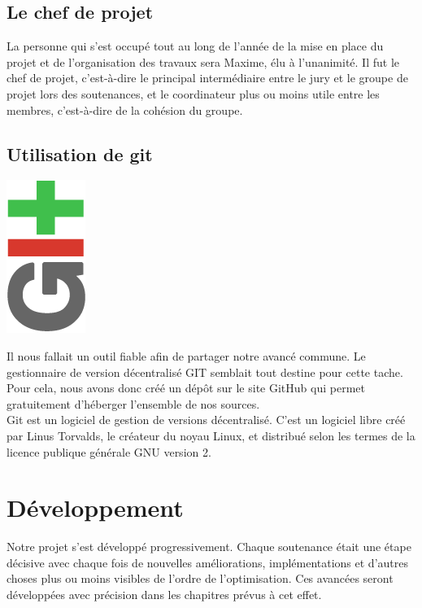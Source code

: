 \documentclass[12pt,a4paper]{report}
\begin{document}
\section{Le chef de projet}

La personne qui s'est occupé tout au long de l'année de la mise en place du projet et de l'organisation des travaux sera Maxime, élu à l'unanimité. Il fut le chef de projet, c'est-à-dire le principal intermédiaire entre le jury et le groupe de projet lors des soutenances, et le coordinateur plus ou moins utile entre les membres, c'est-à-dire de la cohésion du groupe.

\section{Utilisation de git}

\begin{center}
\includegraphics[scale =0.5]{git.png}
\end{center}

Il nous fallait un outil fiable afin de partager notre avancé commune. Le gestionnaire de version décentralisé GIT semblait tout destine pour cette tache. Pour cela, nous avons donc créé un dépôt sur le site GitHub qui permet gratuitement d'héberger l'ensemble de nos sources.\\
Git est un logiciel de gestion de versions décentralisé. C'est un logiciel libre créé par Linus Torvalds, le créateur du noyau Linux, et distribué selon les termes de la licence publique générale GNU version 2.


\chapter{Développement}
Notre projet s'est développé progressivement. Chaque soutenance était une étape décisive avec chaque fois de nouvelles améliorations, implémentations et d'autres choses plus ou moins visibles de l'ordre de l'optimisation.
Ces avancées seront développées avec précision dans les chapitres prévus à cet effet.
\end{document}
